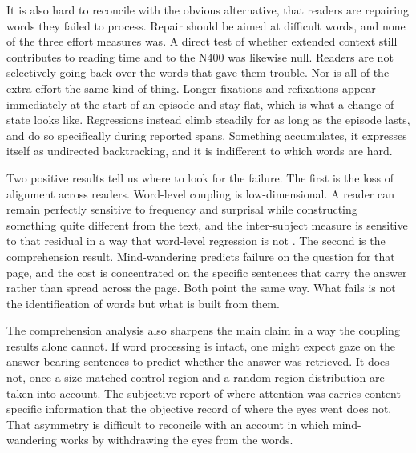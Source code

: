 \documentclass[11pt]{article}
\begin{document}
It is also hard to reconcile with the obvious alternative, that readers are repairing words they
failed to process. Repair should be aimed at difficult words, and none of the three effort
measures was. A direct test of whether extended context still contributes to reading time and to
the N400 was likewise null. Readers are not selectively going back over the words that gave them
trouble.
Nor is all of the extra effort the same kind of thing. Longer fixations and refixations appear immediately at the start of an episode and stay flat, which is what a change of state looks like. Regressions instead climb steadily for as long as the episode lasts, and do so specifically during reported spans. Something accumulates, it expresses itself as undirected backtracking, and it is indifferent to which words are hard.

Two positive results tell us where to look for the failure. The first is the loss of alignment
across readers. Word-level coupling is low-dimensional. A reader can remain perfectly sensitive
to frequency and surprisal while constructing something quite different from the text, and the
inter-subject measure is sensitive to that residual in a way that word-level regression is not
\citep{simony2016,nastase2019}. The second is the comprehension result. Mind-wandering predicts
failure on the question for that page, and the cost is concentrated on the specific sentences
that carry the answer rather than spread across the page. Both point the same way. What fails
is not the identification of words but what is built from them.

The comprehension analysis also sharpens the main claim in a way the coupling results alone
cannot. If word processing is intact, one might expect gaze on the answer-bearing sentences to
predict whether the answer was retrieved. It does not, once a size-matched control region and a
random-region distribution are taken into account. The subjective report of where attention was
carries content-specific information that the objective record of where the eyes went does not.
That asymmetry is difficult to reconcile with an account in which mind-wandering works by
withdrawing the eyes from the words.
\end{document}
